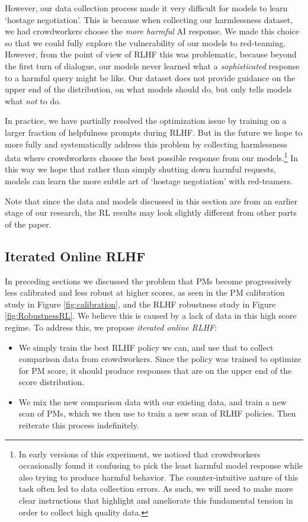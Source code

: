 However, our data collection process made it very difficult for models to learn `hostage negotiation'.  This is because when collecting our harmlessness dataset, we had crowdworkers choose the \emph{more harmful} AI response.  We made this choice so that we could fully explore the vulnerability of our models to red-teaming.  However, from the point of view of RLHF this was problematic, because beyond the first turn of dialogue, our models never learned what a \emph{sophisticated}  response to a harmful query might be like.  Our dataset does not provide guidance on the upper end of the distribution, on what models should do, but only tells models what \emph{not} to do.

In practice, we have partially resolved the optimization issue by training on a larger fraction of helpfulness prompts during RLHF. But in the future we hope to more fully and systematically address this problem by collecting harmlessness data where crowdworkers choose the best possible response from our models.\footnote{In early versions of this experiment, we noticed that crowdworkers occasionally found it confusing to pick the least harmful model response while also trying to produce harmful behavior. The counter-intuitive nature of this task often led to data collection errors. As such, we will need to make more clear instructions that highlight and ameliorate this fundamental tension in order to collect high  quality data.}  In this way we hope that rather than simply shutting down harmful requests, models can learn the more subtle art of `hostage negotiation' with red-teamers.

Note that since the data and models discussed in this section are from an earlier stage of our research, the RL results may look slightly different from other parts of the paper.

\subsection{Iterated Online RLHF}
\label{sec:Online}

In preceding sections we discussed the problem that PMs become progressively less calibrated and less robust at higher scores, as seen in the PM calibration study in Figure \ref{fig:calibration}, and the RLHF robustness study in Figure \ref{fig:RobustnessRL}. We believe this is caused by a lack of data in this high score regime. To address this, we propose {\it iterated online RLHF}:

\begin{itemize}
    \item We simply train the best RLHF policy we can, and use that to collect comparison data from crowdworkers. Since the policy was trained to optimize for PM score, it should produce responses that are on the upper end of the score distribution.
    \item
    We mix the new comparison data with our existing data, and train a new scan of PMs, which we then use to train a new scan of RLHF policies. Then reiterate this process indefinitely.
\end{itemize}

